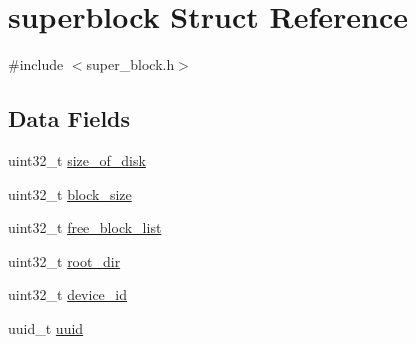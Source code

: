 \hypertarget{structsuperblock}{\section{superblock Struct Reference}
\label{structsuperblock}
}


{\ttfamily \#include $<$super\-\_\-block.\-h$>$}

\subsection*{Data Fields}
\begin{DoxyCompactItemize}
\item 
uint32\-\_\-t \hyperlink{structsuperblock_a42dadb3b15d8f871bf1bc132b1ede650}{size\-\_\-of\-\_\-disk}
\item 
uint32\-\_\-t \hyperlink{structsuperblock_a9e3fb1e50a1c71b2337df296222d9553}{block\-\_\-size}
\item 
uint32\-\_\-t \hyperlink{structsuperblock_a1ca5e6fd54241f9c2f848530a51bf66c}{free\-\_\-block\-\_\-list}
\item 
uint32\-\_\-t \hyperlink{structsuperblock_aec71d39272df61eb33d94a4675d349be}{root\-\_\-dir}
\item 
uint32\-\_\-t \hyperlink{structsuperblock_a658c495cd1900eadce3b800e3ebdac7a}{device\-\_\-id}
\item 
uuid\-\_\-t \hyperlink{structsuperblock_a0c9cfc131b27ae3b98b1533bba4c58ef}{uuid}
\end{DoxyCompactItemize}


